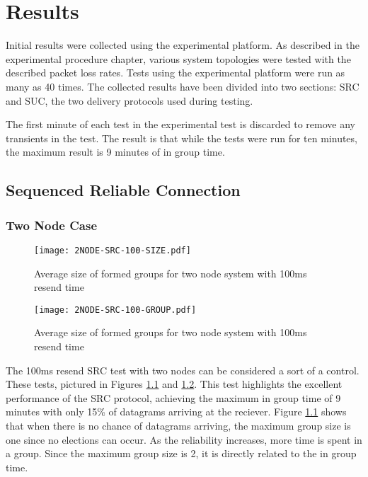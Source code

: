\chapter{Results}

Initial results were collected using the experimental platform. As described in
the experimental procedure chapter, various system topologies were tested with
the described packet loss rates. Tests using the experimental platform were run
as many as 40 times. The collected results have been divided into two sections:
SRC and SUC, the two delivery protocols used during testing.

The first minute of each test in the experimental test is discarded to remove
any transients in the test. The result is that while the tests were run for
ten minutes, the maximum result is 9 minutes of in group time.

\section{Sequenced Reliable Connection}

\subsection{Two Node Case}

\begin{figure}[!h]
\centering
\texttt{[image: 2NODE-SRC-100-SIZE.pdf]}
\caption{Average size of formed groups for two node system with 100ms resend time}
\label{fig:MGS-SRC-2NODE-100}
\end{figure}

\begin{figure}[!h]
\centering
\texttt{[image: 2NODE-SRC-100-GROUP.pdf]}
\caption{Average size of formed groups for two node system with 100ms resend time}
\label{fig:IGT-SRC-2NODE-100}
\end{figure}

The 100ms resend SRC test with two nodes can be considered a sort of a control.
These tests, pictured in Figures \ref{fig:MGS-SRC-2NODE-100} and
\ref{fig:IGT-SRC-2NODE-100}. This test highlights the excellent performance of the
SRC protocol, achieving the maximum in group time of 9 minutes with only 15\%
of datagrams arriving at the reciever. Figure \ref{fig:MGS-SRC-2NODE-100} shows
that when there is no chance of datagrams arriving, the maximum group size is
one since no elections can occur. As the reliability increases, more time is
spent in a group. Since the maximum group size is 2, it is directly related to
the in group time.

